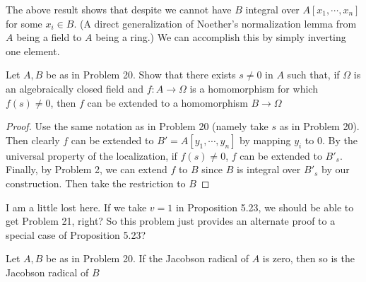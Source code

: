 \documentclass{solution}
\begin{document}
{\color{red} The above result shows that despite we cannot have $B$ integral over $A[x_1, \cdots, x_n]$ for some $x_i \in B$. (A direct generalization of Noether's normalization lemma from $A$ being a field to $A$ being a ring.) We can accomplish this by simply inverting one element.}

\begin{problem}
    Let $A, B$ be as in Problem 20. Show that there exists $s \ne 0$ in $A$ such that, if $\Omega$ is an algebraically closed field and $f: A \rightarrow \Omega$ is a homomorphism for which $f(s) \ne 0$, then $f$ can be extended to a homomorphism $B \rightarrow \Omega$
\end{problem}

\begin{proof}
    Use the same notation as in Problem 20 (namely take $s$ as in Problem 20). Then clearly $f$ can be extended to $B' = A[y_1, \cdots, y_n]$ by mapping $y_i$ to $0$. By the universal property of the localization, if $f(s) \ne 0$, $f$ can be extended to $B'_s$. Finally, by Problem 2, we can extend $f$ to $B$ since $B$ is integral over $B'_s$ by our construction. Then take the restriction to $B$
\end{proof}

{\color{red} I am a little lost here. If we take $v = 1$ in Proposition 5.23, we should be able to get Problem 21, right? So this problem just provides an alternate proof to a special case of Proposition 5.23?}

\begin{problem}
    Let $A, B$ be as in Problem 20. If the Jacobson radical of $A$ is zero, then so is the Jacobson radical of $B$
\end{problem}
\end{document}
